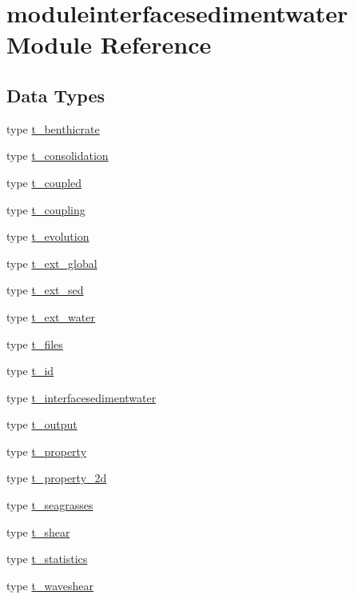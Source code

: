 \hypertarget{namespacemoduleinterfacesedimentwater}{}\section{moduleinterfacesedimentwater Module Reference}
\label{namespacemoduleinterfacesedimentwater}
\subsection*{Data Types}
\begin{DoxyCompactItemize}
\item 
type \mbox{\hyperlink{structmoduleinterfacesedimentwater_1_1t__benthicrate}{t\+\_\+benthicrate}}
\item 
type \mbox{\hyperlink{structmoduleinterfacesedimentwater_1_1t__consolidation}{t\+\_\+consolidation}}
\item 
type \mbox{\hyperlink{structmoduleinterfacesedimentwater_1_1t__coupled}{t\+\_\+coupled}}
\item 
type \mbox{\hyperlink{structmoduleinterfacesedimentwater_1_1t__coupling}{t\+\_\+coupling}}
\item 
type \mbox{\hyperlink{structmoduleinterfacesedimentwater_1_1t__evolution}{t\+\_\+evolution}}
\item 
type \mbox{\hyperlink{structmoduleinterfacesedimentwater_1_1t__ext__global}{t\+\_\+ext\+\_\+global}}
\item 
type \mbox{\hyperlink{structmoduleinterfacesedimentwater_1_1t__ext__sed}{t\+\_\+ext\+\_\+sed}}
\item 
type \mbox{\hyperlink{structmoduleinterfacesedimentwater_1_1t__ext__water}{t\+\_\+ext\+\_\+water}}
\item 
type \mbox{\hyperlink{structmoduleinterfacesedimentwater_1_1t__files}{t\+\_\+files}}
\item 
type \mbox{\hyperlink{structmoduleinterfacesedimentwater_1_1t__id}{t\+\_\+id}}
\item 
type \mbox{\hyperlink{structmoduleinterfacesedimentwater_1_1t__interfacesedimentwater}{t\+\_\+interfacesedimentwater}}
\item 
type \mbox{\hyperlink{structmoduleinterfacesedimentwater_1_1t__output}{t\+\_\+output}}
\item 
type \mbox{\hyperlink{structmoduleinterfacesedimentwater_1_1t__property}{t\+\_\+property}}
\item 
type \mbox{\hyperlink{structmoduleinterfacesedimentwater_1_1t__property__2d}{t\+\_\+property\+\_\+2d}}
\item 
type \mbox{\hyperlink{structmoduleinterfacesedimentwater_1_1t__seagrasses}{t\+\_\+seagrasses}}
\item 
type \mbox{\hyperlink{structmoduleinterfacesedimentwater_1_1t__shear}{t\+\_\+shear}}
\item 
type \mbox{\hyperlink{structmoduleinterfacesedimentwater_1_1t__statistics}{t\+\_\+statistics}}
\item 
type \mbox{\hyperlink{structmoduleinterfacesedimentwater_1_1t__waveshear}{t\+\_\+waveshear}}
\end{DoxyCompactItemize}
